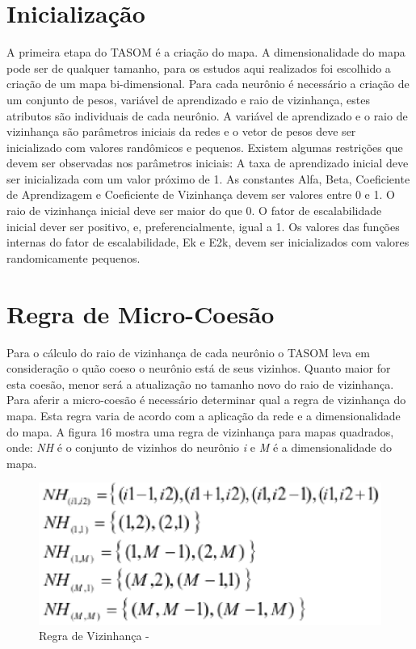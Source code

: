 \section{Inicialização}
A primeira etapa do TASOM é a criação do mapa. A dimensionalidade do mapa pode ser de qualquer tamanho, para os estudos aqui realizados foi escolhido a criação de um mapa bi-dimensional. Para cada neurônio é necessário a criação de um conjunto de pesos, variável de aprendizado e raio de vizinhança, estes atributos são individuais de cada neurônio. A variável de aprendizado e o raio de vizinhança são parâmetros iniciais da redes e o vetor de pesos deve ser inicializado com valores randômicos e pequenos. Existem algumas restrições que devem ser observadas nos parâmetros iniciais: A taxa de aprendizado inicial deve ser inicializada com um valor próximo de 1. As constantes Alfa, Beta, Coeficiente de Aprendizagem e Coeficiente de Vizinhança devem ser valores entre 0 e 1. O raio de vizinhança inicial deve ser maior do que 0. O fator de escalabilidade inicial dever ser positivo, e, preferencialmente, igual a 1. Os valores das funções internas do fator de escalabilidade, Ek e E2k, devem ser inicializados com valores randomicamente pequenos. 

\section{Regra de Micro-Coesão}
Para o cálculo do raio de vizinhança de cada neurônio o TASOM leva em consideração o quão coeso o neurônio está de seus vizinhos. Quanto maior for esta coesão, menor será a atualização no tamanho novo do raio de vizinhança. Para aferir a micro-coesão é necessário determinar qual a regra de vizinhança do mapa. Esta regra varia de acordo com a aplicação da rede e a dimensionalidade do mapa. A figura 16 mostra uma regra de vizinhança para mapas quadrados, onde: \textit{NH} é o conjunto de vizinhos do neurônio \textit{i} e \textit{M} é a dimensionalidade do mapa. 


\begin{figure}[!h]
\centering
\includegraphics[keepaspectratio=true,scale=0.50]
{figuras/dimensionalidade.eps}
\caption{Regra de Vizinhança - }
\label{data_titatic}
\end{figure}

